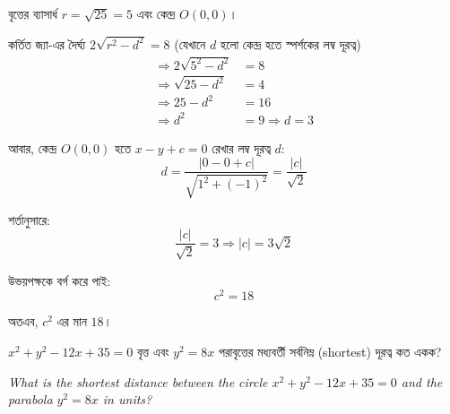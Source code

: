 \documentclass[12pt, a4paper]{article}
\begin{document}
\begin{tcolorbox}[solutionbox={সমাধান (Solution)}]
    \noindent
    বৃত্তের ব্যাসার্ধ $r = \sqrt{25} = 5$ এবং কেন্দ্র $O(0, 0)$।
    
    \vspace{0.5em}
    কর্তিত জ্যা-এর দৈর্ঘ্য $2\sqrt{r^2 - d^2} = 8$ (যেখানে $d$ হলো কেন্দ্র হতে স্পর্শকের লম্ব দূরত্ব)
    \begin{align*}
        \Rightarrow 2\sqrt{5^2 - d^2} &= 8 \\
        \Rightarrow \sqrt{25 - d^2} &= 4 \\
        \Rightarrow 25 - d^2 &= 16 \\
        \Rightarrow d^2 &= 9 \Rightarrow d = 3
    \end{align*}
    
    \vspace{0.5em}
    আবার, কেন্দ্র $O(0, 0)$ হতে $x - y + c = 0$ রেখার লম্ব দূরত্ব $d$:
    \[ d = \frac{|0 - 0 + c|}{\sqrt{1^2 + (-1)^2}} = \frac{|c|}{\sqrt{2}} \]
    
    \vspace{0.5em}
    শর্তানুসারে:
    \[ \frac{|c|}{\sqrt{2}} = 3 \Rightarrow |c| = 3\sqrt{2} \]
    
    \vspace{0.5em}
    উভয়পক্ষকে বর্গ করে পাই:
    \[ c^2 = 18 \]
    
    \vspace{0.5em}
    অতএব, $c^2$ এর মান $18$।
\end{tcolorbox}

\vspace{2em}

\begin{tcolorbox}[questionbox={প্রশ্ন (Question) 14}]
    \noindent
    $x^2 + y^2 - 12x + 35 = 0$ বৃত্ত এবং $y^2 = 8x$ পরাবৃত্তের মধ্যবর্তী সর্বনিম্ন (shortest) দূরত্ব কত একক?
    
    \vspace{0.8em}
    \begin{english}
    \noindent\textit{\color{darkgray}
    What is the shortest distance between the circle $x^2 + y^2 - 12x + 35 = 0$ and the parabola $y^2 = 8x$ in units?
    }
    \end{english}
\end{tcolorbox}
\end{document}
